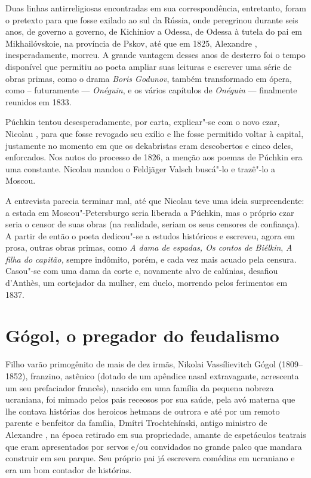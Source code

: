Duas linhas antirreligiosas encontradas em sua correspondência,
entretanto, foram o pretexto para que fosse exilado ao sul da Rússia,
onde peregrinou durante seis anos, de governo a governo, de Kichiniov a
Odessa, de Odessa à tutela do pai em Mikhailóvskoie, na província de
Pskov, até que em 1825, Alexandre , inesperadamente, morreu. A grande
vantagem desses anos de desterro foi o tempo disponível que permitiu ao
poeta ampliar suas leituras e escrever uma série de obras primas, como o
drama \emph{Boris Godunov}, também transformado em ópera, como --
futuramente --- \emph{Onéguin}, e os vários capítulos de
\emph{Onéguin} --- finalmente reunidos em 1833.

Púchkin tentou desesperadamente, por carta, explicar"-se com o novo czar,
Nicolau , para que fosse revogado seu exílio e lhe fosse permitido
voltar à capital, justamente no momento em que os dekabristas eram
descobertos e cinco deles, enforcados. Nos autos do processo de 1826, a
menção aos poemas de Púchkin era uma constante. Nicolau mandou o
Feldjäger Valsch buscá"-lo e trazê"-lo a Moscou.

A entrevista parecia terminar mal, até que Nicolau teve uma ideia
surpreendente: a estada em Moscou"-Petersburgo seria liberada a Púchkin,
mas o próprio czar seria o censor de suas obras (na realidade, seriam
os seus censores de confiança). A partir de então o poeta dedicou"-se a
estudos históricos e escreveu, agora em prosa, outras obras primas,
como \emph{A dama de espadas, Os contos de Biélkin}, \emph{A filha do
capitão,} sempre indômito, porém, e cada vez mais acuado pela censura.
Casou"-se com uma dama da corte e, novamente alvo de calúnias, desafiou
d'Anthès, um cortejador da mulher, em duelo, morrendo pelos ferimentos
em 1837.



\chapter{Gógol, o pregador do feudalismo}

Filho varão primogênito de mais de dez irmãs, Nikolai Vassílievitch
Gógol (1809--1852), franzino, astênico (dotado de um apêndice nasal
extravagante, acrescenta um seu prefaciador francês), nascido em uma
família da pequena nobreza ucraniana, foi mimado pelos pais receosos por
sua saúde, pela avó materna que lhe contava histórias dos heroicos
hetmans de outrora e até por um remoto parente e benfeitor da família,
Dmítri Trochtchínski, antigo ministro de Alexandre , na época retirado
em sua propriedade, amante de espetáculos teatrais que eram apresentados
por servos e/ou convidados no grande palco que mandara construir em seu
parque. Seu próprio pai já escrevera comédias em ucraniano e era um bom
contador de histórias.

